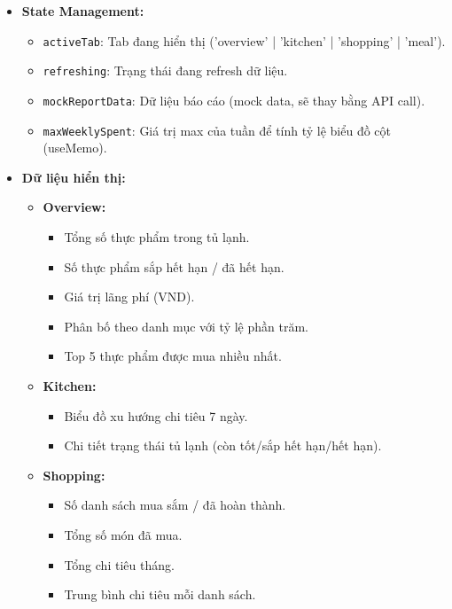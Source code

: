 \begin{itemize}
\begin{itemize}
        \end{itemize}
    \item \textbf{State Management:}
        \begin{itemize}
            \item \texttt{activeTab}: Tab đang hiển thị ('overview' | 'kitchen' | 'shopping' | 'meal').
            \item \texttt{refreshing}: Trạng thái đang refresh dữ liệu.
            \item \texttt{mockReportData}: Dữ liệu báo cáo (mock data, sẽ thay bằng API call).
            \item \texttt{maxWeeklySpent}: Giá trị max của tuần để tính tỷ lệ biểu đồ cột (useMemo).
        \end{itemize}
    \item \textbf{Dữ liệu hiển thị:}
        \begin{itemize}
            \item \textbf{Overview:}
                \begin{itemize}
                    \item Tổng số thực phẩm trong tủ lạnh.
                    \item Số thực phẩm sắp hết hạn / đã hết hạn.
                    \item Giá trị lãng phí (VND).
                    \item Phân bố theo danh mục với tỷ lệ phần trăm.
                    \item Top 5 thực phẩm được mua nhiều nhất.
                \end{itemize}
            \item \textbf{Kitchen:}
                \begin{itemize}
                    \item Biểu đồ xu hướng chi tiêu 7 ngày.
                    \item Chi tiết trạng thái tủ lạnh (còn tốt/sắp hết hạn/hết hạn).
                \end{itemize}
            \item \textbf{Shopping:}
                \begin{itemize}
                    \item Số danh sách mua sắm / đã hoàn thành.
                    \item Tổng số món đã mua.
                    \item Tổng chi tiêu tháng.
                    \item Trung bình chi tiêu mỗi danh sách.

\end{itemize}
\end{itemize}
\end{itemize}

